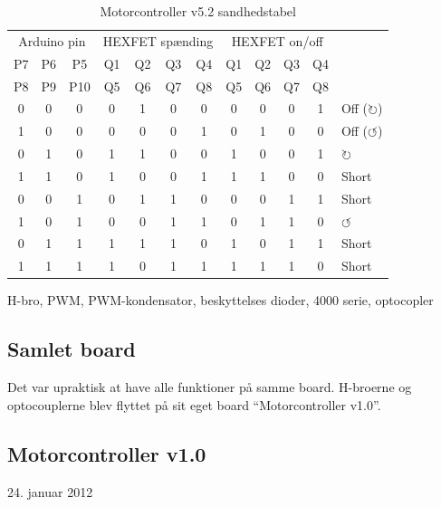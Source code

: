 \documentclass[a4paper,oneside,article,danish,table]{memoir}
\newcommand{\boarddate}[1]{\textcolor{blue!80!black}{#1}}
\begin{document}
\begin{table}[htbp]
  \caption{Motorcontroller v5.2 sandhedstabel}
  \centering
  \begin{tabular}{ccc|cccc|ccccl}
    \toprule
    \multicolumn{3}{c}{Arduino pin}&\multicolumn{4}{c}{HEXFET spænding}&\multicolumn{4}{c}{HEXFET on/off}\\
    P7&P6&P5 &Q1&Q2&Q3&Q4 &Q1&Q2&Q3&Q4\\
    P8&P9&P10 &Q5&Q6&Q7&Q8 &Q5&Q6&Q7&Q8\\
    \midrule
    0&0&0 &0&1&0&0 &0&0&0&1 & Off ($\circlearrowright$)\\
    1&0&0 &0&0&0&1 &0&1&0&0 & Off ($\circlearrowleft$)\\
    0&1&0 &1&1&0&0 &1&0&0&1 & $\circlearrowright$\\
    1&1&0 &1&0&0&1 &1&1&0&0 & Short\\
    0&0&1 &0&1&1&0 &0&0&1&1 & Short\\
    1&0&1 &0&0&1&1 &0&1&1&0 & $\circlearrowleft$\\
    0&1&1 &1&1&1&0 &1&0&1&1 & Short\\
    1&1&1 &1&0&1&1 &1&1&1&0 & Short\\
    \bottomrule
  \end{tabular}
  \label{tab:sandhed}
\end{table}

H-bro, PWM, PWM-kondensator, beskyttelses dioder, 4000 serie, optocopler

\subsection{Samlet board}
Det var upraktisk at have alle funktioner på samme board. H-broerne og optocouplerne blev flyttet på sit eget board “Motorcontroller v1.0”.

\subsection{Motorcontroller v1.0} 
\boarddate{24. januar 2012}
\end{document}
